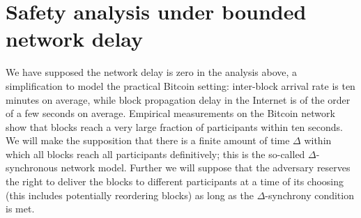 \documentclass{article}
\begin{document}



\section*{Safety analysis under bounded network delay}
We have supposed the network delay is zero in the analysis above, a simplification to model the practical Bitcoin setting: inter-block arrival rate is ten minutes on average, while block propagation delay in the Internet is of the order of a few seconds on average. Empirical measurements on the Bitcoin network show that  blocks reach a very large fraction of participants within ten seconds. We will make the supposition that there is a finite amount of time $\Delta$ within which all blocks reach all participants definitively; this is the so-called $\Delta$-synchronous network model. Further we will suppose that the adversary reserves the right to deliver the blocks to different participants at a time of its choosing (this includes potentially reordering blocks) as long as the $\Delta$-synchrony condition is met. 
\end{document}
